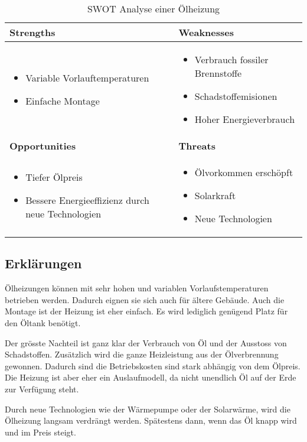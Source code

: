 \begin{table}[h!]
\begin{tabular}[c]{|p{}|p{}|}
  \hline
  \textbf{Strengths} &
  \textbf{Weaknesses} \\ \hline
  
  \begin{itemize}
    \item Variable Vorlauftemperaturen
    \item Einfache Montage
  \end{itemize}
  &
  
  \begin{itemize}
    \item Verbrauch fossiler Brennstoffe
    \item Schadstoffemisionen
    \item Hoher Energieverbrauch
  \end{itemize}
  \\ \hline
  
  \textbf{Opportunities} &
  \textbf{Threats} \\ \hline
  
  \begin{itemize}
    \item Tiefer Ölpreis
    \item Bessere Energieeffizienz durch neue Technologien
  \end{itemize}
  &
  
  \begin{itemize}
  	\item Ölvorkommen erschöpft
    \item Solarkraft
    \item Neue Technologien
  \end{itemize}  
  \\ \hline
\end{tabular}
\label{swot:warmepumpe}
\caption{SWOT Analyse einer Ölheizung}
\end{table}

\subsection{Erklärungen}

Ölheizungen können mit sehr hohen und variablen Vorlaufstemperaturen betrieben werden. Dadurch eignen sie sich auch für ältere Gebäude. 
Auch die Montage ist der Heizung ist eher einfach. Es wird lediglich genügend Platz für den Öltank benötigt.

Der grösste Nachteil ist ganz klar der Verbrauch von Öl und der Ausstoss von Schadstoffen. Zusätzlich wird die ganze Heizleistung aus der Ölverbrennung gewonnen.
Dadurch sind die Betriebskosten sind stark abhängig von dem Ölpreis.
Die Heizung ist aber eher ein Auslaufmodell, da nicht unendlich Öl auf der Erde zur Verfügung steht.

Durch neue Technologien wie der Wärmepumpe oder der Solarwärme, wird die Ölheizung langsam verdrängt werden. Spätestens dann, wenn das Öl knapp wird und im Preis steigt.



